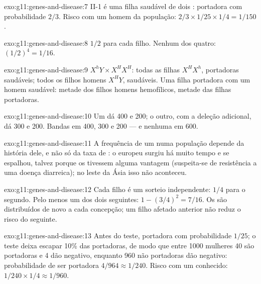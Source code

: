 \begin{solution}{exo:g11:genes-and-disease:7}
II-1 é uma filha saudável de dois : portadora com
probabilidade $2/3$. Risco com um homem da população: $2/3 \times 1/25 \times 1/4
= 1/150$.
\end{solution}

\begin{solution}{exo:g11:genes-and-disease:8}
$1/2$ para cada filho. Nenhum dos quatro: $(1/2)^4 = 1/16$.
\end{solution}

\begin{solution}{exo:g11:genes-and-disease:9}
$X^hY \times X^HX^H$: todas as filhas $X^HX^h$, portadoras saudáveis;
todos os filhos homens $X^HY$, saudáveis. Uma filha portadora com um
homem saudável: metade dos filhos homens hemofílicos, metade das filhas
portadoras.
\end{solution}

\begin{solution}{exo:g11:genes-and-disease:10}
Um  dá 400 e 200; o outro, com a deleção adicional, dá 300 e 200.
Bandas em 400, 300 e 200 --- e nenhuma em 600.
\end{solution}

\begin{solution}{exo:g11:genes-and-disease:11}
A frequência de um  numa população depende da história dele, e não
só da taxa de : o  europeu surgiu há muito tempo e se
espalhou, talvez porque os  tivessem alguma vantagem
(suspeita-se de resistência a uma doença diarreica); no leste da Ásia
isso não aconteceu.
\end{solution}

\begin{solution}{exo:g11:genes-and-disease:12}
Cada filho é um sorteio independente: $1/4$ para o segundo. Pelo menos
um dos dois seguintes: $1 - (3/4)^2 = 7/16$. Os  são distribuídos
de novo a cada concepção; um filho afetado anterior não reduz o risco do
seguinte.
\end{solution}

\begin{solution}{exo:g11:genes-and-disease:13}
Antes do teste, portadora com probabilidade $1/25$; o teste deixa
escapar 10\% das portadoras, de modo que entre 1000 mulheres 40 são
portadoras e 4 dão negativo, enquanto 960 não portadoras dão negativo:
probabilidade de ser portadora $4/964 \approx 1/240$. Risco com um
 conhecido: $1/240 \times 1/4
\approx 1/960$.
\end{solution}

